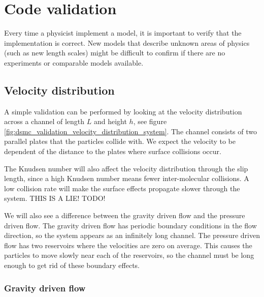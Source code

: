 \section{Code validation}
Every time a physicist implement a model, it is important to verify that the implementation is correct. New models that describe unknown areas of physics (such as new length scales) might be difficult to confirm if there are no experiments or comparable models available. 
\subsection{Velocity distribution}
A simple validation can be performed by looking at the velocity distribution across a channel of length $L$ and height $h$, see figure \ref{fig:dsmc_validation_velocity_distribution_system}. The channel consists of two parallel plates that the particles collide with. We expect the velocity to be dependent of the distance to the plates where surface collisions occur. 

The Knudsen number will also affect the velocity distribution through the slip length, since a high Knudsen number means fewer inter-molecular collisions. A low collision rate will make the surface effects propagate slower through the system. THIS IS A LIE! TODO!

We will also see a difference between the gravity driven flow and the pressure driven flow. The gravity driven flow has periodic boundary conditions in the flow direction, so the system appears as an infinitely long channel. The pressure driven flow has two reservoirs where the velocities are zero on average. This causes the particles to move slowly near each of the reservoirs, so the channel must be long enough to get rid of these boundary effects. 

\subsubsection{Gravity driven flow}
